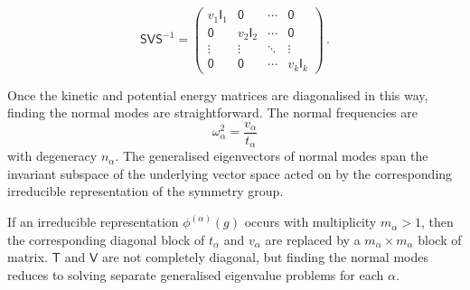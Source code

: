 \documentclass{article}
\theoremstyle{plain}\theoremheaderfont{\normalfont\itshape}\theorembodyfont{\rmfamily}\theoremseparator{.}\newtheorem*{rem}{Remark}\newtheorem*{ex}{Example}\newtheorem*{proof}{Proof}\newtheorem*{altp}{Alternative proof}
\theoremstyle{plain}\theoremheaderfont{\normalfont\bfseries}\theorembodyfont{\rmfamily}\theoremseparator{.}\newtheorem{thm}{Theorem}[section]\newtheorem{lem}[thm]{Lemma}\newtheorem{prop}[thm]{Proposition}\newtheorem*{cor}{Corollary}\newtheorem{defn}[thm]{Definition}\newtheorem{clm}[thm]{Claim}\newtheorem{clminproof}{Claim}
\theoremstyle{break}\theoremheaderfont{\normalfont\itshape}\theorembodyfont{\rmfamily}\theoremseparator{.\medskip}\newtheorem*{proofskip}{Proof}\newtheorem*{exs}{Examples}\newtheorem*{rems}{Remarks}
\theoremstyle{break}\theoremheaderfont{\normalfont\bfseries}\theorembodyfont{\rmfamily}\theoremseparator{.\medskip}\newtheorem{lemskip}[thm]{Lemma}\newtheorem{defnskip}[thm]{Definition}\newtheorem{propskip}[thm]{Proposition}\newtheorem{thmskip}[thm]{Theorem}
\numberwithin{equation}{section}
\begin{document}
	\[\mathsf{SVS}^{-1}=\begin{pmatrix}
		v_1\mathsf{I}_1 & \mathsf{0} & \cdots & \mathsf{0}\\
		\mathsf{0} & v_2\mathsf{I}_2 & \cdots & \mathsf{0}\\
		\vdots & \vdots & \ddots & \vdots\\
		\mathsf{0} & \mathsf{0} & \cdots & v_k\mathsf{I}_k
	\end{pmatrix}\,.\]

	Once the kinetic and potential energy matrices are diagonalised in this way, finding the normal modes are straightforward. The normal frequencies are
	\[\omega_\alpha^2=\frac{v_\alpha}{t_\alpha}\]
	with degeneracy \(n_\alpha\). The generalised eigenvectors of normal modes span the invariant subspace of the underlying vector space acted on by the corresponding irreducible representation of the symmetry group.

	If an irreducible representation \(\phi^{(\alpha)}(g)\) occurs with multiplicity \(m_\alpha >1\), then the corresponding diagonal block of \(t_\alpha\) and \(v_\alpha\) are replaced by a \(m_\alpha\times m_\alpha\) block of matrix. \(\mathsf{T}\) and \(\mathsf{V}\) are not completely diagonal, but finding the normal modes reduces to solving separate generalised eigenvalue problems for each \(\alpha\).
\end{document}
